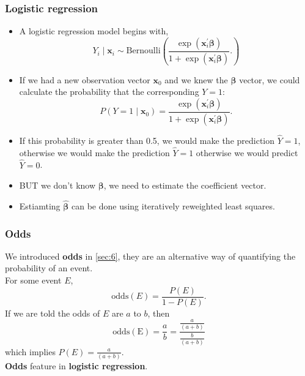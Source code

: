 \documentclass[a4paper]{article}
\begin{document}
\subsubsection{Logistic regression}
\begin{itemize}
	\item A logistic regression model begins with,
	\[
		Y_i \mid \symbf{x}_i \sim \mathrm{Bernoulli} \left( \frac{\exp(\symbf{x}_i^\prime \symbf{\beta})}{1+\exp(\symbf{x}^\prime_i\symbf{\beta})}. \right)
	\]
	\item If we had a new observation vector \( \symbf{x}_0 \) and we knew the \( \symbf{\beta} \) vector, we could calculate the probability that the corresponding \( Y = 1 \):
	\[
		P(Y = 1 \mid \symbf{x}_0) = \frac{\exp(\symbf{x}_i^\prime \symbf{\beta})}{1+\exp(\symbf{x}^\prime_i\symbf{\beta})}.
	\]
	\item If this probability is greater than 0.5, we would make the prediction \( \hat{Y} = 1 \), otherwise we would make the prediction \( \hat{Y} = 1 \) otherwise we would predict \( \hat{Y} = 0 \).
	\item BUT we don't know \( \symbf{\beta} \), we need to estimate the coefficient vector.
	\item Estiamting \( \hat{\symbf{\beta}} \) can be done using \textcolor{myred}{iteratively reweighted least squares}.
\end{itemize}
\subsubsection{Odds}
We introduced \textbf{odds} in \cref{sec:6}, they are an alternative way of quantifying the probability of an event.\\
For some event \( E \),
\[
	\mathrm{odds}(E) = \frac{P(E)}{1-P(E)}.
\]
If we are told the odds of \( E \) are \( a \) to \( b \), then
\[
	\mathrm{odds(E)} = \frac{a}{b} = \frac{\frac{a}{(a+b)}}{\frac{b}{(a+b)}}
\]
which implies \( P(E) = \frac{a}{(a+b)} \).\\
\textbf{Odds} feature in \textcolor{myblue}{\textbf{logistic regression}}.
\end{document}
